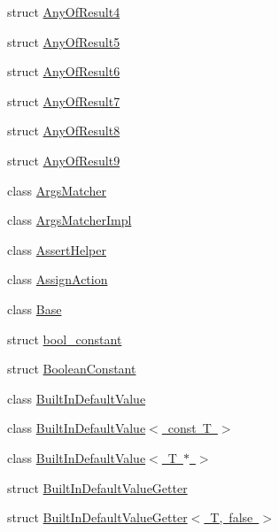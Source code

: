 \begin{DoxyCompactItemize}
\item 
struct \mbox{\hyperlink{structtesting_1_1internal_1_1AnyOfResult4}{Any\+Of\+Result4}}
\item 
struct \mbox{\hyperlink{structtesting_1_1internal_1_1AnyOfResult5}{Any\+Of\+Result5}}
\item 
struct \mbox{\hyperlink{structtesting_1_1internal_1_1AnyOfResult6}{Any\+Of\+Result6}}
\item 
struct \mbox{\hyperlink{structtesting_1_1internal_1_1AnyOfResult7}{Any\+Of\+Result7}}
\item 
struct \mbox{\hyperlink{structtesting_1_1internal_1_1AnyOfResult8}{Any\+Of\+Result8}}
\item 
struct \mbox{\hyperlink{structtesting_1_1internal_1_1AnyOfResult9}{Any\+Of\+Result9}}
\item 
class \mbox{\hyperlink{classtesting_1_1internal_1_1ArgsMatcher}{Args\+Matcher}}
\item 
class \mbox{\hyperlink{classtesting_1_1internal_1_1ArgsMatcherImpl}{Args\+Matcher\+Impl}}
\item 
class \mbox{\hyperlink{classtesting_1_1internal_1_1AssertHelper}{Assert\+Helper}}
\item 
class \mbox{\hyperlink{classtesting_1_1internal_1_1AssignAction}{Assign\+Action}}
\item 
class \mbox{\hyperlink{classtesting_1_1internal_1_1Base}{Base}}
\item 
struct \mbox{\hyperlink{structtesting_1_1internal_1_1bool__constant}{bool\+\_\+constant}}
\item 
struct \mbox{\hyperlink{structtesting_1_1internal_1_1BooleanConstant}{Boolean\+Constant}}
\item 
class \mbox{\hyperlink{classtesting_1_1internal_1_1BuiltInDefaultValue}{Built\+In\+Default\+Value}}
\item 
class \mbox{\hyperlink{classtesting_1_1internal_1_1BuiltInDefaultValue_3_01const_01T_01_4}{Built\+In\+Default\+Value$<$ const T $>$}}
\item 
class \mbox{\hyperlink{classtesting_1_1internal_1_1BuiltInDefaultValue_3_01T_01_5_01_4}{Built\+In\+Default\+Value$<$ T $\ast$ $>$}}
\item 
struct \mbox{\hyperlink{structtesting_1_1internal_1_1BuiltInDefaultValueGetter}{Built\+In\+Default\+Value\+Getter}}
\item 
struct \mbox{\hyperlink{structtesting_1_1internal_1_1BuiltInDefaultValueGetter_3_01T_00_01false_01_4}{Built\+In\+Default\+Value\+Getter$<$ T, false $>$}}
\item 

\end{DoxyCompactItemize}
